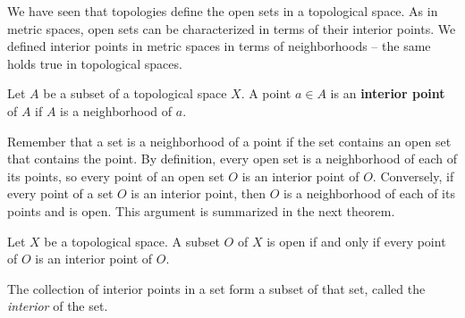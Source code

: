 \begin{comment}

\ActivitySolution

\ba
\item  To prove that $O$ is open, we can write $O$ as a union of open sets.

\item Let $a \in O$. Since $O$ is a neighborhood of $a$, there exists an open set $O_a$ such that $a \in O_a \subseteq O$.

\item We will show that 
\[\bigcup_{a \in O} O_a = O.\]
Since any union of open sets is an open set, this will verify that $O$ is an open set. Since $O_a \subseteq O$ for each $a \in O$, it follows that $\ds \bigcup_{a \in O} O_a \subseteq O$. Now let $x \in O$. Then $x \in O_x \subseteq \bigcup_{a \in O} O_a$ and $O \subseteq \bigcup_{a \in O} O_a$. 

\ea

\end{comment}

\label{sec_interior_set_top}

We have seen that topologies define the open sets in a topological space. As in metric spaces, open sets can be characterized in terms of their interior points. We defined interior points in metric spaces in terms of neighborhoods -- the same holds true in topological spaces. 

\begin{definition} Let $A$ be a subset of a topological space $X$. A point $a \in A$ is an \textbf{interior point} of $A$ if $A$ is a neighborhood of $a$.
\end{definition}

Remember that a set is a neighborhood of a point if the set contains an open set that contains the point. By definition, every open set is a neighborhood of each of its points, so every point of an open set $O$ is an interior point of $O$. Conversely, if every point of a set $O$ is an interior point, then $O$ is a neighborhood of each of its points and is open. This argument is summarized in the next theorem. 

\begin{theorem} Let $X$ be a topological space. A subset $O$ of $X$ is open if and only if every point of $O$ is an interior point of $O$. 
\end{theorem}

The collection of interior points in a set form a subset of that set, called the \emph{interior} of the set.

